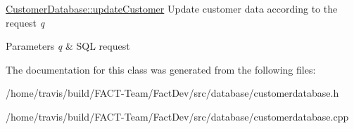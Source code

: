 \hyperlink{classDatabases_1_1CustomerDatabase_a2ef9838798500e7ad4a09a3ed401fc8b}{Customer\-Database\-::update\-Customer} Update customer data according to the request {\itshape q} 


\begin{DoxyParams}{Parameters}
{\em q} & S\-Q\-L request \\
\hline
\end{DoxyParams}


The documentation for this class was generated from the following files\-:\begin{DoxyCompactItemize}
\item 
/home/travis/build/\-F\-A\-C\-T-\/\-Team/\-Fact\-Dev/src/database/customerdatabase.\-h\item 
/home/travis/build/\-F\-A\-C\-T-\/\-Team/\-Fact\-Dev/src/database/customerdatabase.\-cpp\end{DoxyCompactItemize}
